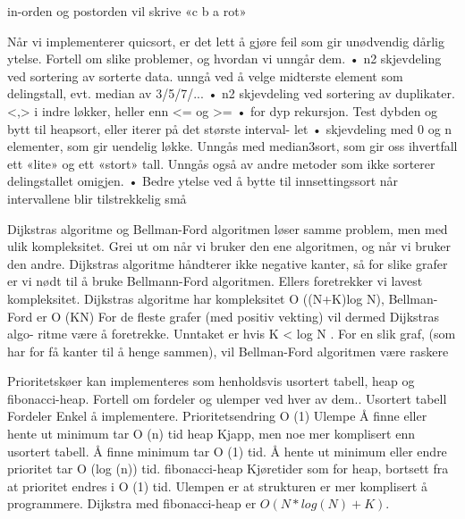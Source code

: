 \documentclass[10pt,a4paper]{article}
\begin{document}
\begin{multicols}{4}
{\begin{lstlisting}
\end{lstlisting}
 in-orden og postorden vil skrive «c b a rot»

\color{orange} Når vi implementerer quicsort, er det lett å gjøre feil som gir unødvendig dårlig ytelse.
Fortell om slike problemer, og hvordan vi unngår dem.\color{black}
• n2 skjevdeling ved sortering av sorterte data. unngå ved å velge midterste element
som delingstall, evt. median av 3/5/7/...
• n2 skjevdeling ved sortering av duplikater. <,> i indre løkker, heller enn <= og >=
• for dyp rekursjon. Test dybden og bytt til heapsort, eller iterer på det største interval-
let
• skjevdeling med 0 og n elementer, som gir uendelig løkke. Unngås med median3sort,
som gir oss ihvertfall ett «lite» og ett «stort» tall. Unngås også av andre metoder som
ikke sorterer delingstallet omigjen.
• Bedre ytelse ved å bytte til innsettingssort når intervallene blir tilstrekkelig små

\color{orange} Dijkstras algoritme og Bellman-Ford algoritmen løser samme problem, men med ulik
kompleksitet. Grei ut om når vi bruker den ene algoritmen, og når vi bruker den andre.\color{black}
Dijkstras algoritme håndterer ikke negative kanter, så for slike grafer er vi nødt til å bruke
Bellmann-Ford algoritmen.
Ellers foretrekker vi lavest kompleksitet. Dijkstras algoritme har kompleksitet O ((N+K)log N),
Bellman-Ford er O (KN) For de fleste grafer (med positiv vekting) vil dermed Dijkstras algo-
ritme være å foretrekke. Unntaket er hvis K < log N . For en slik graf, (som har for få kanter til
å henge sammen), vil Bellman-Ford algoritmen være raskere

\color{orange} Prioritetskøer kan implementeres som henholdsvis usortert tabell, heap og fibonacci-heap.
Fortell om fordeler og ulemper ved hver av dem..\color{black}
Usortert tabell
Fordeler Enkel å implementere. Prioritetsendring O (1)
Ulempe Å finne eller hente ut minimum tar O (n) tid
heap
Kjapp, men noe mer komplisert enn usortert tabell. Å finne minimum tar O (1) tid. Å hente
ut minimum eller endre prioritet tar O (log (n)) tid.
fibonacci-heap
Kjøretider som for heap, bortsett fra at prioritet endres i O (1) tid. Ulempen er at strukturen
er mer komplisert å programmere.
Dijkstra med fibonacci-heap er $O(N*log(N)+K)$.


}
\end{multicols}
\end{document}
